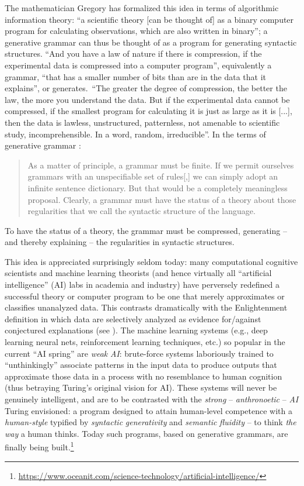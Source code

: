 \documentclass[output=paper]{langsci/langscibook}
\begin{document}
The mathematician Gregory \citet[64]{Chaitin2005} has formalized this idea in
terms of algorithmic information theory: {“a scientific theory [can
be thought of] as a binary computer program for calculating observations, which
are also written in binary”; a generative grammar can thus be thought of as a
program for generating syntactic structures.}{} {“And you have a
law of nature if there is compression, if the experimental data is compressed
into a computer program”, equivalently a grammar, “that has a smaller number of
bits than are in the data that it explains”, or generates.}{~“}{The
greater the degree of compression, the better the law, the more you understand
the data.} {But if the experimental data cannot be compressed, if
the smallest program for calculating it is just as large as it is [...], then
the data is lawless, unstructured, patternless, not amenable to scientific
study, incomprehensible.} In a word, random, irreducible”. In
the terms of generative grammar \parencite[285]{ChomskyMiller1963}:
\begin{quote}As a matter of principle, a grammar must be finite. If we permit
ourselves grammars with an unspecifiable set of rules[,] we can simply adopt an
infinite sentence dictionary. But that would be a completely meaningless proposal.
Clearly, a grammar must have the status of a theory about those regularities that
we call the syntactic structure of the language.
\end{quote}
To have the status of a theory, the grammar must be compressed,
generating -- and thereby explaining -- the regularities in syntactic structures.

This idea is appreciated surprisingly seldom today: many computational
cognitive scientists and machine learning theorists (and hence virtually all
“artificial intelligence” (AI) labs in academia and industry) have perversely
redefined a successful theory or computer program to be one that merely
approximates or classifies unanalyzed data. This contrasts dramatically with
the Enlightenment definition in which data are selectively analyzed as evidence
for\slash against conjectured explanations (see
\citealt{Popper1963,Chomsky2000,Deutsch2011}). The machine learning systems
(e.g., deep learning neural nets, reinforcement learning techniques, etc.) so
popular in the current “AI spring” are \emph{weak} \emph{AI}: brute-force
systems laboriously trained to “unthinkingly” associate patterns in the input
data to produce outputs that approximate those data in a process with no
resemblance to human cognition (thus betraying Turing’s original vision for
AI). These systems will never be genuinely intelligent, and are to be
contrasted with the \emph{strong} – \emph{anthronoetic} – \emph{AI} Turing
envisioned: a program designed to attain human-level competence with a
\emph{human-style} typified by \emph{syntactic} \emph{generativity} and
\emph{semantic} \emph{fluidity} – to think \emph{the} \emph{way} a human
thinks. Today such programs,  based on generative grammars, are finally being
built.\footnote{\url{https://www.oceanit.com/science-technology/artificial-intelligence/}}
\end{document}
